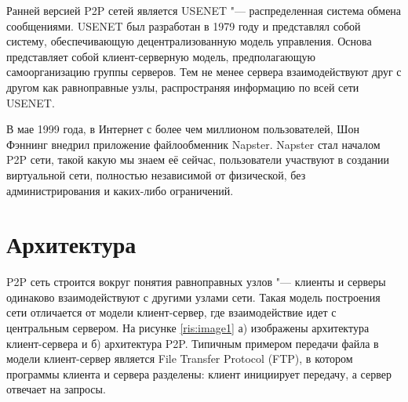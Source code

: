 \documentclass[bachelor, och, coursework]{SCWorks}
\begin{document}
Ранней версией P2P сетей является USENET "--- распределенная система обмена сообщениями. USENET был разработан в 1979 году и представлял собой систему, обеспечивающую децентрализованную модель управления. Основа представляет собой клиент-серверную модель, предполагающую самоорганизацию группы серверов. Тем не менее сервера взаимодействуют друг с другом как равноправные узлы, распространяя информацию по всей сети USENET.

В мае 1999 года, в Интернет с более чем миллионом пользователей, Шон Фэннинг внедрил приложение файлообменник Napster. Napster стал началом P2P сети, такой какую мы знаем её сейчас, пользователи участвуют в создании виртуальной сети, полностью независимой от физической, без администрирования и каких-либо ограничений.

\section{Архитектура} %
P2P сеть строится вокруг понятия равноправных узлов "--- клиенты и серверы одинаково взаимодействуют с другими узлами сети. Такая модель построения сети отличается от модели клиент-сервер, где взаимодействие идет с центральным сервером. 
На рисунке \ref{ris:image1} а) изображены архитектура клиент-сервера и б) архитектура P2P. Типичным примером передачи файла в модели клиент-сервер является File Transfer Protocol (FTP), в котором программы клиента и сервера разделены: клиент инициирует передачу, а сервер отвечает на запросы. 
\end{document}
